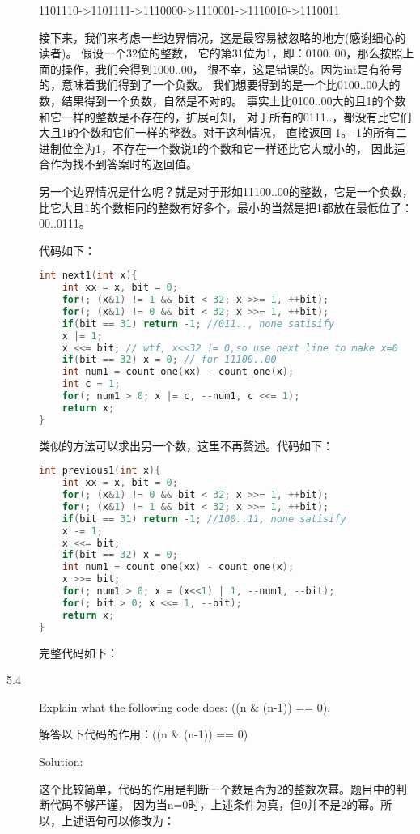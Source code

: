 \begin{description}
1101110->1101111->1110000->1110001->1110010->1110011

接下来，我们来考虑一些边界情况，这是最容易被忽略的地方(感谢细心的读者)。 假设一个32位的整数， 它的第31位为1，即：0100..00，那么按照上面的操作，我们会得到1000..00， 很不幸，这是错误的。因为int是有符号的，意味着我们得到了一个负数。 我们想要得到的是一个比0100..00大的数，结果得到一个负数，自然是不对的。 事实上比0100..00大的且1的个数和它一样的整数是不存在的，扩展可知， 对于所有的0111..，都没有比它们大且1的个数和它们一样的整数。对于这种情况， 直接返回-1。-1的所有二进制位全为1，不存在一个数说1的个数和它一样还比它大或小的， 因此适合作为找不到答案时的返回值。

另一个边界情况是什么呢？就是对于形如11100..00的整数，它是一个负数， 比它大且1的个数相同的整数有好多个，最小的当然是把1都放在最低位了：00..0111。

代码如下：
\begin{lstlisting}[language=C++]
int next1(int x){
    int xx = x, bit = 0;
    for(; (x&1) != 1 && bit < 32; x >>= 1, ++bit);
    for(; (x&1) != 0 && bit < 32; x >>= 1, ++bit);
    if(bit == 31) return -1; //011.., none satisify
    x |= 1;
    x <<= bit; // wtf, x<<32 != 0,so use next line to make x=0
    if(bit == 32) x = 0; // for 11100..00
    int num1 = count_one(xx) - count_one(x);
    int c = 1;
    for(; num1 > 0; x |= c, --num1, c <<= 1);
    return x;
}
\end{lstlisting}

类似的方法可以求出另一个数，这里不再赘述。代码如下：
\begin{lstlisting}[language=C++]
int previous1(int x){
    int xx = x, bit = 0;
    for(; (x&1) != 0 && bit < 32; x >>= 1, ++bit);
    for(; (x&1) != 1 && bit < 32; x >>= 1, ++bit);
    if(bit == 31) return -1; //100..11, none satisify
    x -= 1;
    x <<= bit;
    if(bit == 32) x = 0;
    int num1 = count_one(xx) - count_one(x);
    x >>= bit;
    for(; num1 > 0; x = (x<<1) | 1, --num1, --bit);
    for(; bit > 0; x <<= 1, --bit);
    return x;
}
\end{lstlisting}

完整代码如下：



\item[5.4] Explain what the following code does: ((n \& (n-1)) == 0).

解答以下代码的作用：((n \& (n-1)) == 0)

Solution:

这个比较简单，代码的作用是判断一个数是否为2的整数次幂。题目中的判断代码不够严谨， 因为当n=0时，上述条件为真，但0并不是2的幂。所以，上述语句可以修改为：


\end{description}
